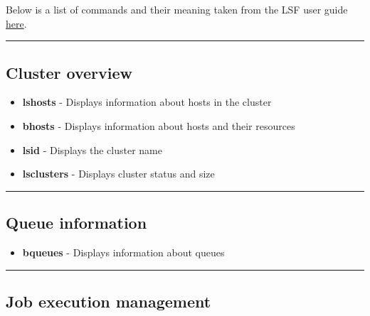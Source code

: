 \documentclass[11pt]{article}
\providecommand{\tightlist}{%
      \setlength{\itemsep}{0pt}\setlength{\parskip}{0pt}}
\begin{document}
Below is a list of commands and their meaning taken from the LSF user
guide
\href{https://www.ibm.com/support/knowledgecenter/SSETD4_9.1.3/lsf_users_guide}{here}.

    \begin{center}\rule{0.5\linewidth}{\linethickness}\end{center}

    \subsection{Cluster overview}\label{cluster-overview}

\begin{itemize}
\item
  \textbf{lshosts} - Displays information about hosts in the cluster
\item
  \textbf{bhosts} - Displays information about hosts and their resources
\item
  \textbf{lsid} - Displays the cluster name
\item
  \textbf{lsclusters} - Displays cluster status and size
\end{itemize}

    \begin{center}\rule{0.5\linewidth}{\linethickness}\end{center}

    \subsection{Queue information}\label{queue-information}

\begin{itemize}
\tightlist
\item
  \textbf{bqueues} - Displays information about queues
\end{itemize}

    \begin{center}\rule{0.5\linewidth}{\linethickness}\end{center}

    \subsection{Job execution management}\label{job-execution-management}
\end{document}

